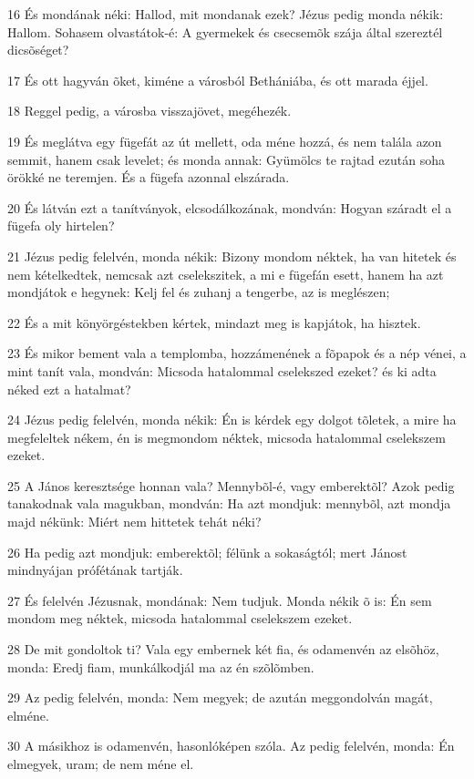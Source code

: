 \par 16 És mondának néki: Hallod, mit mondanak ezek? Jézus pedig monda nékik: Hallom. Sohasem olvastátok-é: A gyermekek és csecsemõk szája által szereztél dicsõséget?
\par 17 És ott hagyván õket, kiméne a városból Bethániába, és ott marada éjjel.
\par 18 Reggel pedig, a városba visszajövet, megéhezék.
\par 19 És meglátva egy fügefát az út mellett, oda méne hozzá, és nem talála azon semmit, hanem csak levelet; és monda annak: Gyümölcs te rajtad ezután soha örökké ne teremjen. És a fügefa azonnal elszárada.
\par 20 És látván ezt a tanítványok, elcsodálkozának, mondván: Hogyan száradt el a fügefa oly hirtelen?
\par 21 Jézus pedig felelvén, monda nékik: Bizony mondom néktek, ha van hitetek és nem kételkedtek, nemcsak azt cselekszitek, a mi e fügefán esett, hanem ha azt mondjátok e hegynek: Kelj fel és zuhanj a tengerbe, az is meglészen;
\par 22 És a mit könyörgéstekben kértek, mindazt meg is kapjátok, ha hisztek.
\par 23 És mikor bement vala a templomba, hozzámenének a fõpapok és a nép vénei, a mint tanít vala, mondván: Micsoda hatalommal cselekszed ezeket? és ki adta néked ezt a hatalmat?
\par 24 Jézus pedig felelvén, monda nékik: Én is kérdek egy dolgot tõletek, a mire ha megfeleltek nékem, én is megmondom néktek, micsoda hatalommal cselekszem ezeket.
\par 25 A János keresztsége honnan vala? Mennybõl-é, vagy emberektõl? Azok pedig tanakodnak vala magukban, mondván: Ha azt mondjuk: mennybõl, azt mondja majd nékünk: Miért nem hittetek tehát néki?
\par 26 Ha pedig azt mondjuk: emberektõl; félünk a sokaságtól; mert Jánost mindnyájan prófétának tartják.
\par 27 És felelvén Jézusnak, mondának: Nem tudjuk. Monda nékik õ is: Én sem mondom meg néktek, micsoda hatalommal cselekszem ezeket.
\par 28 De mit gondoltok ti? Vala egy embernek két fia, és odamenvén az elsõhöz, monda: Eredj fiam, munkálkodjál ma az én szõlõmben.
\par 29 Az pedig felelvén, monda: Nem megyek; de azután meggondolván magát, elméne.
\par 30 A másikhoz is odamenvén, hasonlóképen szóla. Az pedig felelvén, monda: Én elmegyek, uram; de nem méne el.
